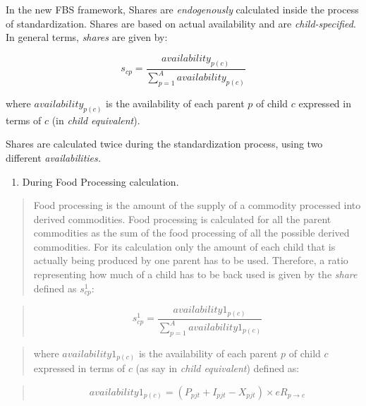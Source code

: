 \documentclass[]{article}
\providecommand{\tightlist}{%
  \setlength{\itemsep}{0pt}\setlength{\parskip}{0pt}}
\begin{document}
In the new FBS framework, Shares are \emph{endogenously} calculated
inside the process of standardization. Shares are based on actual
availability and are \emph{child-specified}. In general terms,
\emph{shares} are given by:

\begin{equation}
\label{eq:sharesGen}
s_{cp} = \frac{availability_{p(c)}}{\sum \limits_{p=1}^A{availability_{p(c)}}}
\end{equation}

where \(availability_{p(c)}\) is the availability of each parent \(p\)
of child \(c\) expressed in terms of \(c\) (in \emph{child equivalent}).

Shares are calculated twice during the standardization process, using
two different \emph{availabilities.}

\begin{enumerate}
\def\labelenumi{\arabic{enumi}.}
\tightlist
\item
  During Food Processing calculation.
\end{enumerate}

\begin{quote}
Food processing is the amount of the supply of a commodity processed
into derived commodities. Food processing is calculated for all the
parent commodities as the sum of the food processing of all the possible
derived commodities. For its calculation only the amount of each child
that is actually being produced by one parent has to be used. Therefore,
a ratio representing how much of a child has to be back used is given by
the \emph{share} defined as \(s^1_{cp}\):
\end{quote}

\begin{quote}
\begin{equation}
\label{eq:shares}
s^{1}_{cp} = \frac{availability1_{p(c)}}{\sum \limits_{p=1}^A{availability1_{p(c)}}}
\end{equation}
\end{quote}

\begin{quote}
where \(availability1_{p(c)}\) is the availability of each parent \(p\)
of child \(c\) expressed in terms of \(c\) (as say in \emph{child
equivalent}) defined as:
\end{quote}

\begin{quote}
\begin{equation}
\label{eq:availability 1}
availability1_{p(c)} = (P_{pjt} + I_{pjt} - X_{pjt})\times eR_{p\to c}
\end{equation}
\end{quote}
\end{document}
